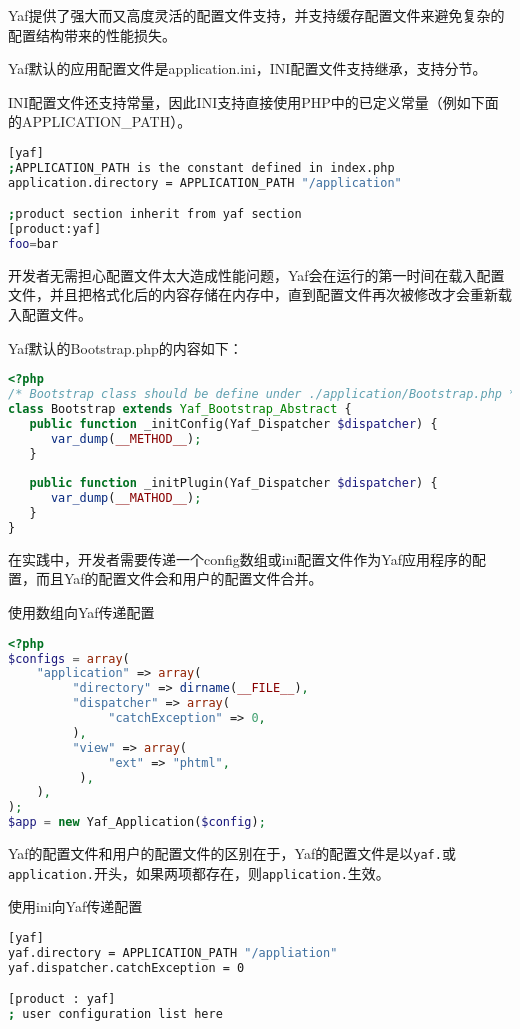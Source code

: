 Yaf提供了强大而又高度灵活的配置文件支持，并支持缓存配置文件来避免复杂的配置结构带来的性能损失。

Yaf默认的应用配置文件是application.ini，INI配置文件支持继承，支持分节。

INI配置文件还支持常量，因此INI支持直接使用PHP中的已定义常量（例如下面的APPLICATION\_PATH）。

\begin{lstlisting}[language=bash]
[yaf]
;APPLICATION_PATH is the constant defined in index.php
application.directory = APPLICATION_PATH "/application"

;product section inherit from yaf section
[product:yaf]
foo=bar
\end{lstlisting}

开发者无需担心配置文件太大造成性能问题，Yaf会在运行的第一时间在载入配置文件，并且把格式化后的内容存储在内存中，直到配置文件再次被修改才会重新载入配置文件。

Yaf默认的Bootstrap.php的内容如下：

\begin{lstlisting}[language=PHP]
<?php
/* Bootstrap class should be define under ./application/Bootstrap.php */
class Bootstrap extends Yaf_Bootstrap_Abstract {
   public function _initConfig(Yaf_Dispatcher $dispatcher) {
      var_dump(__METHOD__);
   }
   
   public function _initPlugin(Yaf_Dispatcher $dispatcher) {
      var_dump(__MATHOD__);
   }
}
\end{lstlisting}


在实践中，开发者需要传递一个config数组或ini配置文件作为Yaf应用程序的配置，而且Yaf的配置文件会和用户的配置文件合并。

\begin{example}
使用数组向Yaf传递配置
\begin{lstlisting}[language=PHP]
<?php
$configs = array(
    "application" => array(
         "directory" => dirname(__FILE__),
         "dispatcher" => array(
              "catchException" => 0,
         ),
         "view" => array(
              "ext" => "phtml",
          ),
    ),
);
$app = new Yaf_Application($config);
\end{lstlisting}
\end{example}

Yaf的配置文件和用户的配置文件的区别在于，Yaf的配置文件是以\texttt{yaf.}或\texttt{application.}开头，如果两项都存在，则\texttt{application.}生效。

\begin{example}
使用ini向Yaf传递配置
\begin{lstlisting}[language=bash]
[yaf]
yaf.directory = APPLICATION_PATH "/appliation"
yaf.dispatcher.catchException = 0

[product : yaf]
; user configuration list here
\end{lstlisting}
\end{example}


